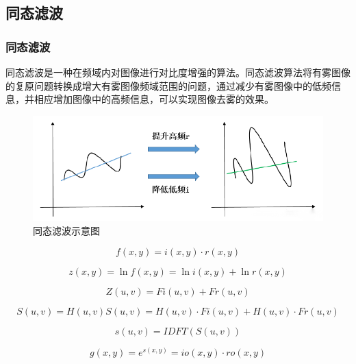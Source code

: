     \subsection{同态滤波}
    \begin{frame}
      \frametitle{同态滤波}
      同态滤波是一种在频域内对图像进行对比度增强的算法。同态滤波算法将有雾图像的复原问题转换成增大有雾图像频域范围的问题，通过减少有雾图像中的低频信息，并相应增加图像中的高频信息，可以实现图像去雾的效果。
      \begin{figure}%
        \centering
        \includegraphics[width=\textwidth]{figures/pic6.png}
        \caption{同态滤波示意图}
      \end{figure}
    \end{frame}

    \begin{frame}
      \begin{equation}
        f(x,y)=i(x,y)·r(x,y)
      \end{equation}

      \begin{equation}
        z(x,y)=\ln f(x,y) =\ln i(x,y) +\ln r(x,y)
      \end{equation}

      \begin{equation}
        Z(u,v)=Fi(u,v) +Fr(u,v)
      \end{equation}

      \begin{equation}
        S(u,v)=H(u,v)S(u,v)=H(u,v)·Fi(u,v) +H(u,v)·Fr(u,v)
      \end{equation}

      \begin{equation}
        s(u,v)=IDFT(S(u,v))
      \end{equation}

      \begin{equation}
        g(x,y)=e^{s(x,y)}=io(x,y)·ro(x,y)
      \end{equation}
    \end{frame}


